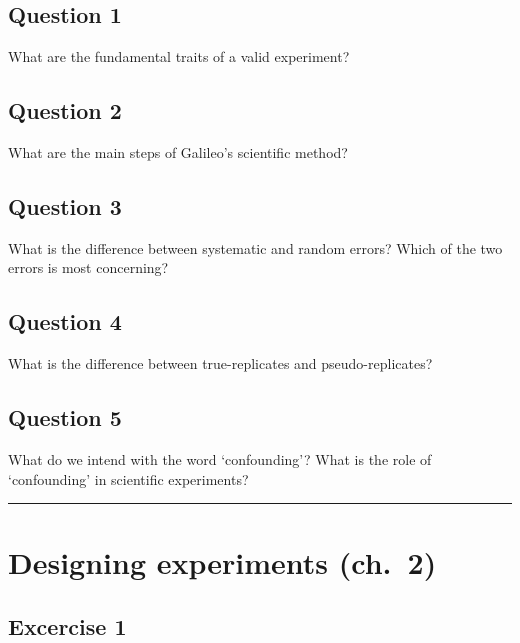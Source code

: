 \documentclass[a4paper,12pt,oneside]{book}
\begin{document}
\hypertarget{question-1}{%
\subsection{Question 1}\label{question-1}}

What are the fundamental traits of a valid experiment?

\hypertarget{question-2}{%
\subsection{Question 2}\label{question-2}}

What are the main steps of Galileo's scientific method?

\hypertarget{question-3}{%
\subsection{Question 3}\label{question-3}}

What is the difference between systematic and random errors? Which of the two errors is most concerning?

\hypertarget{question-4}{%
\subsection{Question 4}\label{question-4}}

What is the difference between true-replicates and pseudo-replicates?

\hypertarget{question-5}{%
\subsection{Question 5}\label{question-5}}

What do we intend with the word `confounding'? What is the role of `confounding' in scientific experiments?

\begin{center}\rule{0.5\linewidth}{0.5pt}\end{center}

\hypertarget{designing-experiments-ch.-2}{%
\section{Designing experiments (ch.~2)}\label{designing-experiments-ch.-2}}

\hypertarget{excercise-1}{%
\subsection{Excercise 1}\label{excercise-1}}
\end{document}
